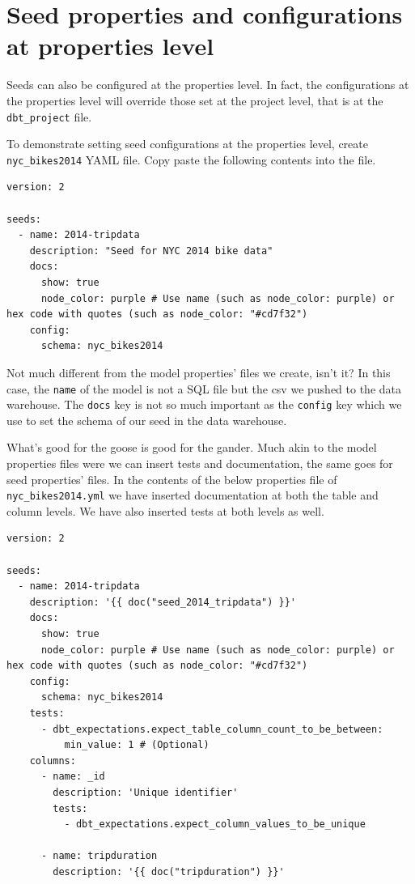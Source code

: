 \documentclass[
]{book}
\begin{document}
\hypertarget{seed-properties-and-configurations-at-properties-level}{%
\section{Seed properties and configurations at properties level}\label{seed-properties-and-configurations-at-properties-level}}

Seeds can also be configured at the properties level. In fact, the configurations at the properties level will override those set at the project level, that is at the \texttt{dbt\_project} file.

To demonstrate setting seed configurations at the properties level, create \texttt{nyc\_bikes2014} YAML file. Copy paste the following contents into the file.

\begin{verbatim}
version: 2

seeds:
  - name: 2014-tripdata
    description: "Seed for NYC 2014 bike data"
    docs:
      show: true 
      node_color: purple # Use name (such as node_color: purple) or hex code with quotes (such as node_color: "#cd7f32")
    config:
      schema: nyc_bikes2014
\end{verbatim}

Not much different from the model properties' files we create, isn't it? In this case, the \texttt{name} of the model is not a SQL file but the csv we pushed to the data warehouse. The \texttt{docs} key is not so much important as the \texttt{config} key which we use to set the schema of our seed in the data warehouse.

What's good for the goose is good for the gander. Much akin to the model properties files were we can insert tests and documentation, the same goes for seed properties' files. In the contents of the below properties file of \texttt{nyc\_bikes2014.yml} we have inserted documentation at both the table and column levels. We have also inserted tests at both levels as well.

\begin{verbatim}
version: 2

seeds:
  - name: 2014-tripdata
    description: '{{ doc("seed_2014_tripdata") }}'
    docs:
      show: true 
      node_color: purple # Use name (such as node_color: purple) or hex code with quotes (such as node_color: "#cd7f32")
    config:
      schema: nyc_bikes2014
    tests:
      - dbt_expectations.expect_table_column_count_to_be_between:
          min_value: 1 # (Optional)
    columns:
      - name: _id
        description: 'Unique identifier'
        tests:
          - dbt_expectations.expect_column_values_to_be_unique

      - name: tripduration
        description: '{{ doc("tripduration") }}'
\end{verbatim}
\end{document}
